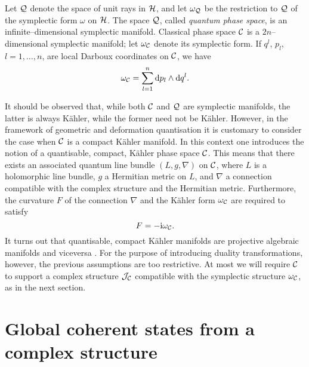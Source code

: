\documentclass[a4paper,a4paper]{article}
\begin{document}
Let ${\cal Q}$ denote the  space of unit rays in ${\cal H}$, and let $\omega_{\cal Q}$ 
be the restriction to ${\cal Q}$ of the symplectic form $\omega$ on ${\cal H}$. 
The space ${\cal Q}$, called {\it quantum phase space}, is an  infinite--dimensional
symplectic manifold. 
Classical phase space ${\cal C}$ is a $2n$--dimensional symplectic 
manifold; let $\omega_{\cal C}$ denote its symplectic form. If $q^l$, $p_l$, $l=1,\ldots, n$, 
are local Darboux coordinates on ${\cal C}$, we have
\begin{equation}
\omega_{\cal C}=\sum_{l=1}^n{\rm d} p_l \wedge {\rm d} q^l.
\label{cano}
\end{equation}

It should be observed that, while both ${\cal C}$ and ${\cal Q}$ 
are symplectic manifolds, the latter is always K\"ahler, while the former 
need not be K\"ahler. However, in the framework of geometric \cite{GQUANT} 
and deformation \cite{BEREZIN, SCHLICHENMAIER, GARCIA} quantisation it is customary 
to consider the case when ${\cal C}$ is a compact K\"ahler manifold. 
In this context one introduces the notion of a quantisable, compact, K\"ahler 
phase space ${\cal C}$. This means that there exists an associated quantum 
line bundle $(L, g, \nabla)$ on ${\cal C}$, where $L$ is a holomorphic line 
bundle, $g$ a Hermitian metric on $L$, and $\nabla$ a connection 
compatible with the complex structure and the Hermitian metric.
Furthermore, the curvature $F$ of the connection $\nabla$ and the K\"ahler form 
$\omega_{\cal C}$ are required to satisfy
\begin{equation}
F=-{\rm i} \omega_{\cal C}.
\label{quantti}
\end{equation}
It turns out that quantisable, compact K\"ahler manifolds are projective 
algebraic manifolds and viceversa \cite{SCHLICHENMAIER}. For the purpose 
of introducing duality transformations, however, the previous assumptions 
are too restrictive. At most we will require ${\cal C}$ to support a complex 
structure ${\cal J}_{\cal C}$ compatible with the symplectic structure 
$\omega_{\cal C}$, as in the next section.

\section{Global coherent states from a complex structure}\label{globcoh}
\end{document}
